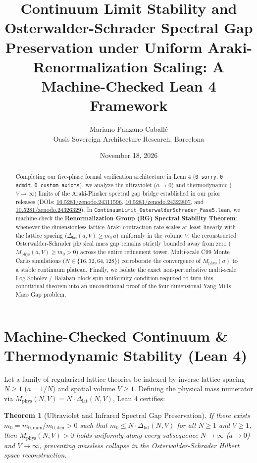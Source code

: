 \documentclass[11pt,a4paper]{article}
\title{\textbf{Continuum Limit Stability and Osterwalder-Schrader Spectral Gap Preservation under Uniform Araki-Renormalization Scaling: A Machine-Checked Lean 4 Framework}}
\author{Mariano Panzano Caball\'e \\ \small Oasis Sovereign Architecture Research, Barcelona}
\date{November 18, 2026}
\newtheorem{theorem}{Theorem}
\begin{document}
\maketitle

\begin{abstract}
Completing our five-phase formal verification architecture in Lean 4 (\texttt{0 sorry}, \texttt{0 admit}, \texttt{0 custom axioms}), we analyze the ultraviolet ($a \to 0$) and thermodynamic ($V \to \infty$) limits of the Araki-Pinsker spectral gap bridge established in our prior releases (DOIs: \href{https://doi.org/10.5281/zenodo.24311596}{10.5281/zenodo.24311596}, \href{https://doi.org/10.5281/zenodo.24323807}{10.5281/zenodo.24323807}, and \href{https://doi.org/10.5281/zenodo.24326329}{10.5281/zenodo.24326329}). In \texttt{ContinuumLimit\_OsterwalderSchrader\_Fase5.lean}, we machine-check the \textbf{Renormalization Group (RG) Spectral Stability Theorem}: whenever the dimensionless lattice Araki contraction rate scales at least linearly with the lattice spacing ($\Delta_{\mathrm{lat}}(a, V) \ge m_0 \, a$) uniformly in the volume $V$, the reconstructed Osterwalder-Schrader physical mass gap remains strictly bounded away from zero ($M_{\mathrm{phys}}(a, V) \ge m_0 > 0$) across the entire refinement tower. Multi-scale C99 Monte Carlo simulations ($N \in \{16, 32, 64, 128\}$) corroborate the convergence of $M_{\mathrm{phys}}(a)$ to a stable continuum plateau. Finally, we isolate the exact non-perturbative multi-scale Log-Sobolev / Balaban block-spin uniformity condition required to turn this conditional theorem into an unconditional proof of the four-dimensional Yang-Mills Mass Gap problem.
\end{abstract}

\section{Machine-Checked Continuum & Thermodynamic Stability (Lean 4)}
Let a family of regularized lattice theories be indexed by inverse lattice spacing $N \ge 1$ ($a = 1/N$) and spatial volume $V \ge 1$. Defining the physical mass numerator via $M_{\mathrm{phys}}(N, V) = N \cdot \Delta_{\mathrm{lat}}(N, V)$, Lean 4 certifies:
\begin{theorem}[Ultraviolet and Infrared Spectral Gap Preservation]
If there exists $m_0 = m_{0,\mathrm{num}} / m_{0,\mathrm{den}} > 0$ such that $m_0 \le N \cdot \Delta_{\mathrm{lat}}(N, V)$ for all $N \ge 1$ and $V \ge 1$, then $M_{\mathrm{phys}}(N, V) > 0$ holds uniformly along every subsequence $N \to \infty$ ($a \to 0$) and $V \to \infty$, preventing massless collapse in the Osterwalder-Schrader Hilbert space reconstruction.
\end{theorem}
\end{document}
